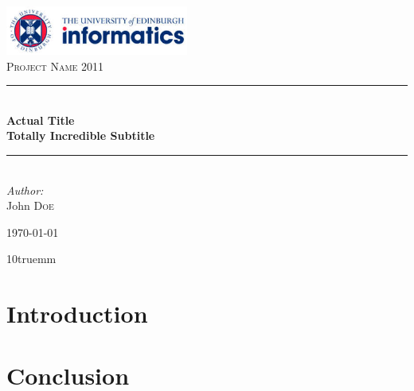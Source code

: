 \documentclass[12pt, a4paper]{article}
\def\thepretitle{Project Name 2011}
\def\themaintitle{Actual Title}
\def\thesubtitle{Totally Incredible Subtitle}
\def\firstname{John}
\def\lastname{Doe}
\newcommand{\HRule}{\rule{\linewidth}{0.5mm}} %
\begin{document}
\begin{titlepage}
\begin{center}
\includegraphics[width=0.45\textwidth]{uoe.jpg}\\[2cm]
\textsc{\LARGE \thepretitle}\\[1.5cm]

\HRule \\[0.4cm]
{ \huge \bfseries \themaintitle}\\[0.5cm]
{ \large \bfseries \thesubtitle}\\
\HRule \\[1.5cm]

\emph{Author:}\\ %

\firstname\textsc{ \lastname}\\

\vfill

{\large \today}

\end{center}
\end{titlepage}

\columnsep 10truemm
\twocolumn

\tableofcontents

\pagebreak

\section{Introduction}
\section{Conclusion}

\onecolumn
\newpage
\appendix
\appendixpage
\end{document}
